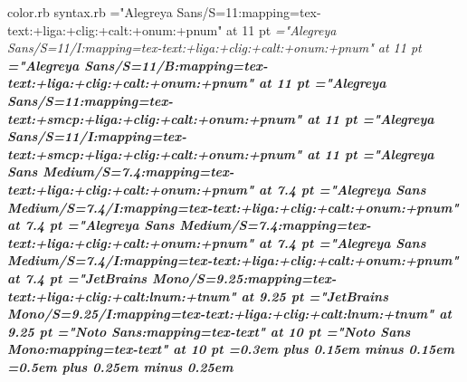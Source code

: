 color.rb
 syntax.rb
%
\def\ldfont     #1#2#3{"#1/S=#2:mapping=tex-text#3"          at #2 pt}%
\def\ldifont    #1#2#3{"#1/S=#2/I:mapping=tex-text#3"        at #2 pt}%
\def\ldbfont    #1#2#3{"#1/S=#2/B:mapping=tex-text#3"        at #2 pt}%
\def\ldbifont   #1#2#3{"#1/S=#2/BI:mapping=tex-text#3"       at #2 pt}%
\def\ldcapfont  #1#2#3{"#1/S=#2:mapping=tex-text:+smcp#3"    at #2 pt}%
\def\ldicapfont #1#2#3{"#1/S=#2/I:mapping=tex-text:+smcp#3"  at #2 pt}%
\def\ldbcapfont #1#2#3{"#1/S=#2/B:mapping=tex-text:+smcp#3"  at #2 pt}%
\def\ldbicapfont#1#2#3{"#1/S=#2/BI:mapping=tex-text:+smcp#3" at #2 pt}%
%
\def\basefamily{Alegreya Sans}%
\def\basesize{11}%
\def\basefeat{:+liga:+clig:+calt:+onum:+pnum}%
\font\rm  =\ldfont    {\basefamily}{\basesize}{\basefeat}%
\font\it  =\ldifont   {\basefamily}{\basesize}{\basefeat}%
\font\bf  =\ldbfont   {\basefamily}{\basesize}{\basefeat}%
\font\caps=\ldcapfont {\basefamily}{\basesize}{\basefeat}%
\font\icap=\ldicapfont{\basefamily}{\basesize}{\basefeat}%
%
\def\supfamily{Alegreya Sans Medium}%
\def\supsize{7.4}%
\def\supfeat{:+liga:+clig:+calt:+onum:+pnum}%
\font\suprm=\ldfont {\supfamily}{\supsize}{\supfeat}%
\font\supit=\ldifont{\supfamily}{\supsize}{\supfeat}%
%
\def\sup#1{\raise 0.73ex\hbox{\suprm #1}}%
\def\isup#1{\raise 0.73ex\hbox{\supit #1}}%
%
\def\subfamily{Alegreya Sans Medium}%
\def\subsize{7.4}%
\def\subfeat{:+liga:+clig:+calt:+onum:+pnum}%
\font\subrm=\ldfont {\subfamily}{\subsize}{\subfeat}%
\font\subit=\ldifont{\subfamily}{\subsize}{\subfeat}%
%
\def\sub#1{\lower 0.23ex\hbox{\subrm #1}}%
\def\isub#1{\lower 0.23ex\hbox{\subit #1}}%
%
\def\codefamily{JetBrains Mono}%
\def\codesize{9.25}%
\def\codefeat{:+liga:+clig:+calt:lnum:+tnum}%
%
\font\fw =\ldfont {\codefamily}{\codesize}{\codefeat}%
\font\ifw=\ldifont{\codefamily}{\codesize}{\codefeat}%
%
\def\fs{%
  \spaceskip=0.5em
  \xspaceskip=0.5em
}%
%
\font\noto    ="Noto Sans:mapping=tex-text"      at 10 pt
\font\notomono="Noto Sans Mono:mapping=tex-text" at 10 pt
%
\rm
\spaceskip =0.3em plus 0.15em minus 0.15em
\xspaceskip=0.5em plus 0.25em minus 0.25em
%
\def\lcap#1{%
  \font\localfont=\ldcapfont{\basefamily}{\basesize}{\basefeat:letterspace=#1}%
  \localfont
  \dimen0=0.0625\fontdimen2\localfont
  \multiply\dimen0 by #1
  \advance\dimen0 by \fontdimen2\localfont
  \spaceskip =   \dimen0 plus 0.5\dimen0 minus 0.5\dimen0
  \xspaceskip=1.5\dimen0 plus 0.5\dimen0 minus 0.5\dimen0
}%
